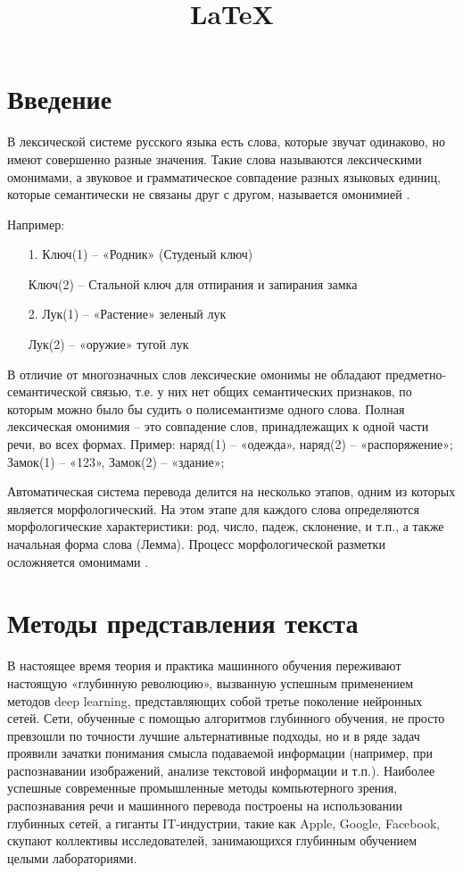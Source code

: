 \documentclass[12pt]{article}
\title{\LaTeX}
\date{}
\begin{document}
\def\dd#1#2{\frac{\partial#1}{\partial#2}}

\section{Введение}

В лексической системе русского языка есть слова, которые звучат одинаково, но имеют совершенно разные значения. Такие слова называются лексическими омонимами, а звуковое и грамматическое совпадение разных языковых единиц, которые семантически не связаны друг с другом, называется омонимией \cite{Homonym}.

Например:
\begin{itemize}
\item[1.] Ключ(1) – «Родник» (Студеный ключ)
\item[] Ключ(2) – Стальной ключ для отпирания и запирания замка
\item[2.] Лук(1) – «Растение» зеленый лук
\item[] Лук(2) – «оружие» тугой лук
\end{itemize}

В отличие от многозначных слов лексические омонимы не обладают предметно-семантической связью, т.е. у них нет общих семантических признаков, по которым можно было бы судить о полисемантизме одного слова. Полная лексическая омонимия – это совпадение слов, принадлежащих к одной части речи, во всех формах. Пример: наряд(1) – «одежда», наряд(2) – «распоряжение»; Замок(1) – «123», Замок(2) – «здание»;

Автоматическая система перевода делится на несколько этапов, одним из которых является морфологический. На этом этапе для каждого слова определяются морфологические характеристики: род, число, падеж, склонение, и т.п., а также начальная форма слова (Лемма). Процесс морфологической разметки осложняется омонимами \cite{Homonym}.
\section{Методы представления текста}
	В настоящее время теория и практика машинного обучения переживают настоящую «глубинную революцию», вызванную успешным применением методов deep learning, представляющих собой третье поколение нейронных сетей. Сети, обученные с помощью алгоритмов глубинного обучения, не просто превзошли по точности лучшие альтернативные подходы, но и в ряде задач проявили зачатки понимания смысла подаваемой информации (например, при распознавании изображений, анализе текстовой информации и т.п.). Наиболее успешные современные промышленные методы компьютерного зрения, распознавания речи и машинного перевода построены на использовании глубинных сетей, а гиганты IT-индустрии, такие как Apple, Google, Facebook, скупают коллективы исследователей, занимающихся глубинным обучением целыми лабораториями.
\end{document}
